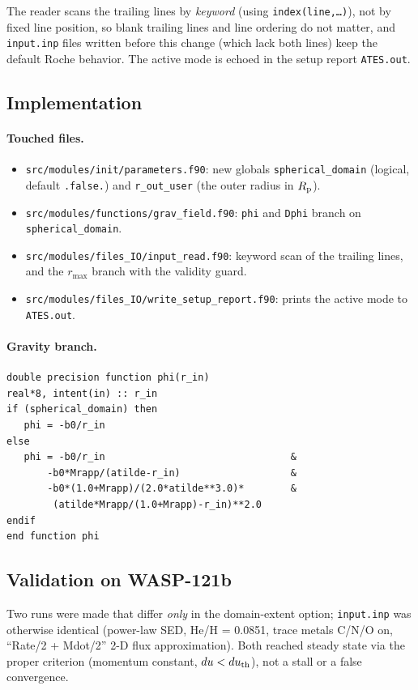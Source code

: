\documentclass[english,a4paper]{kiseon_memo}
\begin{document}
The reader scans the trailing lines by \emph{keyword} (using
\texttt{index(line,\ldots)}), not by fixed line position, so blank trailing
lines and line ordering do not matter, and \texttt{input.inp} files written
before this change (which lack both lines) keep the default Roche behavior. The
active mode is echoed in the setup report \texttt{ATES.out}.

\subsection{Implementation}

\paragraph{Touched files.}
\begin{itemize}
\item \texttt{src/modules/init/parameters.f90}: new globals
  \verb|spherical_domain| (logical, default \verb|.false.|) and
  \verb|r_out_user| (the outer radius in $R_{\rm p}$).
\item \texttt{src/modules/functions/grav\_field.f90}: \verb|phi| and
  \verb|Dphi| branch on \verb|spherical_domain|.
\item \texttt{src/modules/files\_IO/input\_read.f90}: keyword scan of the
  trailing lines, and the $r_{\max}$ branch with the validity guard.
\item \texttt{src/modules/files\_IO/write\_setup\_report.f90}: prints the
  active mode to \texttt{ATES.out}.
\end{itemize}

\paragraph{Gravity branch.}
\begin{lstlisting}
double precision function phi(r_in)
real*8, intent(in) :: r_in
if (spherical_domain) then
   phi = -b0/r_in
else
   phi = -b0/r_in                                &
       -b0*Mrapp/(atilde-r_in)                   &
       -b0*(1.0+Mrapp)/(2.0*atilde**3.0)*        &
        (atilde*Mrapp/(1.0+Mrapp)-r_in)**2.0
endif
end function phi
\end{lstlisting}

\subsection{Validation on WASP-121b}

Two runs were made that differ \emph{only} in the domain-extent option;
\texttt{input.inp} was otherwise identical (power-law SED, He/H = 0.0851, trace
metals C/N/O on, ``Rate/2 + Mdot/2'' 2-D flux approximation). Both reached
steady state via the proper criterion (momentum constant, $du<du_{\rm th}$),
not a stall or a false convergence.
\end{document}
